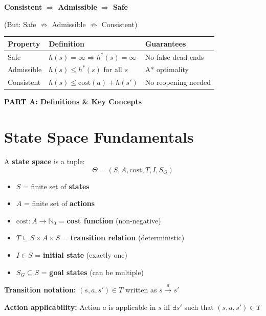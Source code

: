 \documentclass[11pt,a4paper]{article}
\begin{document}
\begin{notebox}
\begin{center}
\textbf{Consistent} $\Rightarrow$ \textbf{Admissible} $\Rightarrow$ \textbf{Safe}

(But: Safe $\not\Rightarrow$ Admissible $\not\Rightarrow$ Consistent)
\end{center}

\begin{tabular}{@{}lll@{}}
\toprule
\textbf{Property} & \textbf{Definition} & \textbf{Guarantees} \\
\midrule
Safe & $h(s)=\infty \Rightarrow h^*(s)=\infty$ & No false dead-ends \\
Admissible & $h(s) \leq h^*(s)$ for all $s$ & A* optimality \\
Consistent & $h(s) \leq \text{cost}(a) + h(s')$ & No reopening needed \\
\bottomrule
\end{tabular}
\end{notebox}

\newpage

\begin{center}
\textbf{\LARGE PART A: Definitions \& Key Concepts}
\end{center}
\vspace{1em}

\renewcommand{\thesection}{A.\arabic{section}}

\section{State Space Fundamentals}

\begin{definitionbox}
A \textbf{state space} is a tuple:
\[\Theta = (S, A, \text{cost}, T, I, S_G)\]
\begin{itemize}[leftmargin=*,nosep]
\item $S$ = finite set of \textbf{states}
\item $A$ = finite set of \textbf{actions}
\item $\text{cost}: A \to \mathbb{N}_0$ = \textbf{cost function} (non-negative)
\item $T \subseteq S \times A \times S$ = \textbf{transition relation} (deterministic)
\item $I \in S$ = \textbf{initial state} (exactly one)
\item $S_G \subseteq S$ = \textbf{goal states} (can be multiple)
\end{itemize}

\textbf{Transition notation:} $(s, a, s') \in T$ written as $s \xrightarrow{a} s'$

\textbf{Action applicability:} Action $a$ is applicable in $s$ iff $\exists s'$ such that $(s, a, s') \in T$
\end{definitionbox}
\end{document}
